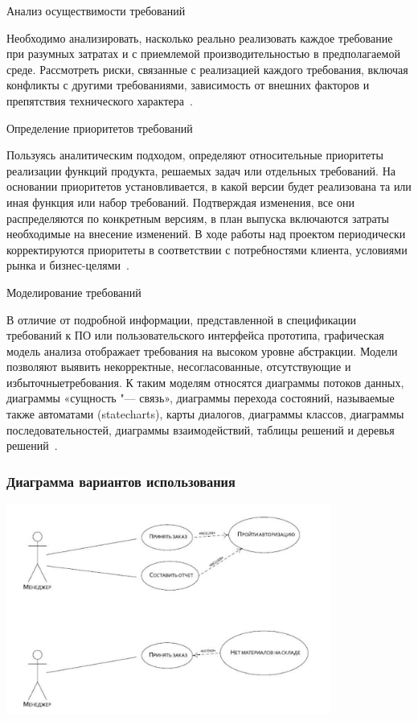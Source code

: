 \documentclass{../industrial-development}
\begin{document}
\lecturenotes

\alert{Анализ осуществимости требований}

Необходимо анализировать, насколько реально реализовать каждое требование при разумных затратах и с приемлемой производительностью в предполагаемой среде. Рассмотреть риски, связанные с реализацией каждого требования, включая конфликты с другими требованиями, зависимость от внешних факторов и препятствия технического характера~\cite[с.~48]{Wiegers}.

\alert{Определение приоритетов требований}

Пользуясь аналитическим подходом, определяют относительные приоритеты реализации функций продукта, решаемых задач или отдельных требований. На основании приоритетов установливается, в какой версии будет реализована та или иная функция или набор требований. Подтверждая изменения, все они распределяются по конкретным версиям, в план выпуска включаются затраты необходимые на внесение изменений. В ходе работы над проектом периодически корректируются приоритеты в соответствии с потребностями клиента, условиями рынка и бизнес-целями~\cite[с.~48--49]{Wiegers}.

\alert{Моделирование требований}

В отличие от подробной информации, представленной в спецификации требований к ПО или пользовательского интерфейса прототипа, графическая модель анализа отображает требования на высоком уровне абстракции. Модели позволяют выявить некорректные, несогласованные, отсутствующие и избыточныетребования. К таким моделям относятся диаграммы потоков данных, диаграммы «сущность "--- связь», диаграммы перехода состояний, называемые также автоматами (statecharts), карты диалогов, диаграммы классов, диаграммы последовательностей, диаграммы взаимодействий, таблицы решений и деревья решений~\cite[с.~49]{Wiegers}.


\begin{frame} \frametitle {Диаграмма вариантов использования}
 \centerline{\includegraphics[width=0.8\textwidth]{pict4.pdf}}
\end{frame}
\end{document}

